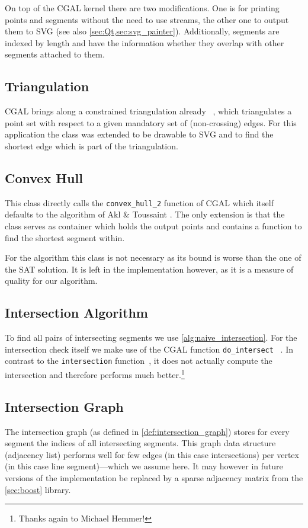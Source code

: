On top of the \gls{CGAL} kernel there are two modifications. One is for
printing points and segments without the need to use streams, the
other one to output them to SVG (see also
\cref{sec:Qt,sec:svg_painter}). Additionally, segments are indexed by
length and have the information whether they overlap with other
segments attached to them.

\subsection{Triangulation}
\gls{CGAL} brings along a constrained triangulation already~%
\cite{cgal_manual_constrained_triangulation},
which triangulates a point set with respect to a given mandatory set
of (non-crossing) edges. For this application the class was extended
to be drawable to SVG and to find the shortest edge which is part of
the triangulation.

\subsection{Convex Hull}
This class directly calls the \verb|convex_hull_2| function of \gls{CGAL}
\cite{cgal_manual_convex_hull} which itself defaults to the algorithm
of Akl \& Toussaint \cite{convex_hull}. The only extension is that
the class serves as container
which holds the output points and contains a function to find the 
shortest segment within.

For the algorithm this class is not necessary as its bound is worse
than the one of the SAT solution. It is left in the implementation
however, as it is a measure of quality for our algorithm.

\subsection{Intersection Algorithm}
To find all pairs of intersecting segments we use 
\cref{alg:naive_intersection}. For the intersection check itself
we make use of the \gls{CGAL} function \verb|do_intersect|%
~\cite{cgal_manual_do_intersect}. In contrast to the
\verb|intersection| function~\cite{cgal_manual_intersection}, it
does not actually compute the intersection and therefore performs
much better.\footnote{Thanks again to Michael Hemmer!}

\subsection{Intersection Graph}
The intersection graph (as defined in \cref{def:intersection_graph})
stores for every segment the indices of all intersecting segments.
This graph data structure (adjacency list) performs well for few
edges (in this case intersections) per vertex (in this case line
segment)---which we assume here. It may however in future versions
of the implementation be replaced by a sparse adjacency matrix from
the \cref{sec:boost} library.

